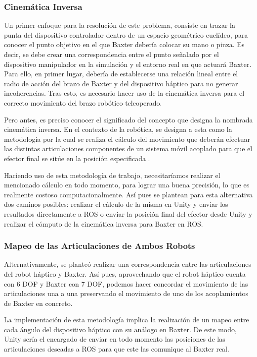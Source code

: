 \subsubsection{Cinemática Inversa}
Un primer enfoque para la resolución de este problema, consiste en trazar la punta del dispositivo controlador dentro de un espacio geométrico euclídeo, para conocer el punto objetivo en el que Baxter debería colocar su mano o pinza. Es decir, se debe crear una correspondencia entre el punto señalado por el dispositivo manipulador en la simulación y el entorno real en que actuará Baxter. Para ello, en primer lugar, debería de establecerse una relación lineal entre el radio de acción del brazo de Baxter y del dispositivo háptico para no generar incoherencias. Tras esto, es necesario hacer uso de la cinemática inversa para el correcto movimiento del brazo robótico teleoperado.

Pero antes, es preciso conocer el significado del concepto que designa la nombrada cinemática inversa. En el contexto de la robótica, se designa a esta como la metodología por la cual se realiza el cálculo del movimiento que deberán efectuar las distintas articulaciones componentes de un sistema móvil acoplado para que el efector final se sitúe en la posición especificada \cite{69,70}.

Haciendo uso de esta metodología de trabajo, necesitaríamos realizar el mencionado cálculo en todo momento, para lograr una buena precisión, lo que es realmente costoso computacionalmente. Así pues se plantean para esta alternativa dos caminos posibles: realizar el cálculo de la misma en Unity y enviar los resultados directamente a ROS o enviar la posición final del efector desde Unity y realizar el cómputo de la cinemática inversa para Baxter en ROS. 

\subsubsection{Mapeo de las Articulaciones de Ambos Robots}
Alternativamente, se planteó realizar una correspondencia entre las articulaciones del robot háptico y Baxter. Así pues, aprovechando que el robot háptico cuenta con 6 DOF y Baxter con 7 DOF, podemos hacer concordar el movimiento de las articulaciones una a una preservando el movimiento de uno de los acoplamientos de Baxter en concreto. 

La implementación de esta metodología implica la realización de un mapeo entre cada ángulo del dispositivo háptico con su análogo en Baxter. De este modo, Unity sería el encargado de enviar en todo momento las posiciones de las articulaciones deseadas a ROS para que este las comunique al Baxter real.

